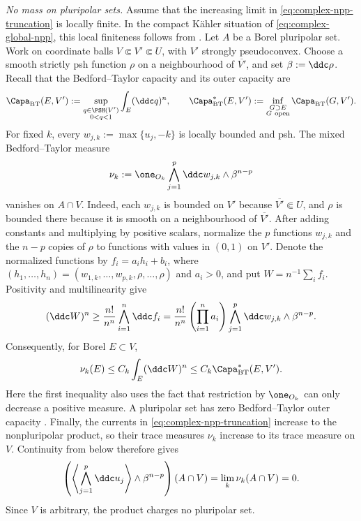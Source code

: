 \emph{No mass on pluripolar sets.}  Assume that the increasing limit in
\eqref{eq:complex-npp-truncation} is locally finite.  In the compact K\"ahler
situation of \eqref{eq:complex-global-npp}, this local finiteness follows from
\cite[Proposition~1.6]{BEGZ10}.  Let \(A\) be a Borel pluripolar set.  Work
on coordinate balls \(V\Subset V'\Subset U\), with \(V'\) strongly
pseudoconvex.  Choose a smooth strictly psh function \(\rho\) on a
neighbourhood of \(\overline{V'}\), and set \(\beta:=\ddc\rho\).  Recall
that the Bedford--Taylor capacity and its outer capacity are
\[
 \Capa_{\mathrm{BT}}(E,V')
 :=\sup_{\substack{q\in\PSH(V')\\0<q<1}}
       \int_E(\ddc q)^n,
 \qquad
 \Capa_{\mathrm{BT}}^*(E,V')
 :=\inf_{\substack{G\supset E\\G\ \mathrm{open}}}
       \Capa_{\mathrm{BT}}(G,V').
\]
For fixed \(k\), every
\(w_{j,k}:=\max\{u_j,-k\}\) is locally bounded and psh.  The mixed
Bedford--Taylor measure
\[
 \nu_k:=\one_{O_k}\bigwedge_{j=1}^p\ddc w_{j,k}
                   \wedge\beta^{n-p}
\]
vanishes on \(A\cap V\).  Indeed, each \(w_{j,k}\) is bounded on \(V'\)
because \(\overline{V'}\Subset U\), and \(\rho\) is bounded there because
it is smooth on a neighbourhood of \(\overline{V'}\).  After adding
constants and multiplying by positive scalars, normalize the \(p\) functions
\(w_{j,k}\) and the \(n-p\) copies of \(\rho\) to functions with values in
\((0,1)\) on \(V'\).  Denote the normalized functions by
\(f_i=a_i h_i+b_i\), where
\((h_1,\ldots,h_n)=(w_{1,k},\ldots,w_{p,k},\rho,\ldots,\rho)\) and
\(a_i>0\), and put \(W=n^{-1}\sum_i f_i\).  Positivity and
multilinearity give
\[
 (\ddc W)^n\geq\frac{n!}{n^n}\bigwedge_{i=1}^n\ddc f_i
 =\frac{n!}{n^n}\left(\prod_{i=1}^na_i\right)
   \bigwedge_{j=1}^p\ddc w_{j,k}\wedge\beta^{n-p}.
\]
Consequently, for Borel \(E\subset V\),
\[
 \nu_k(E)\leq C_k\int_E(\ddc W)^n
             \leq C_k\Capa_{\mathrm{BT}}^*(E,V').
\]
Here the first inequality also uses the fact that restriction by
\(\one_{O_k}\) can only decrease a positive measure.  A pluripolar set has
zero Bedford--Taylor outer capacity
\cite[Theorem~6.9]{BT82}.  Finally, the currents in
\eqref{eq:complex-npp-truncation} increase to the nonpluripolar product, so
their trace measures \(\nu_k\) increase to its trace measure on \(V\).
Continuity from below therefore gives
\[
 \left(\left\langle\bigwedge_{j=1}^p\ddc u_j\right\rangle
       \wedge\beta^{n-p}\right)(A\cap V)
 =\lim_k\nu_k(A\cap V)=0.
\]
Since \(V\) is arbitrary, the product charges no pluripolar set.


